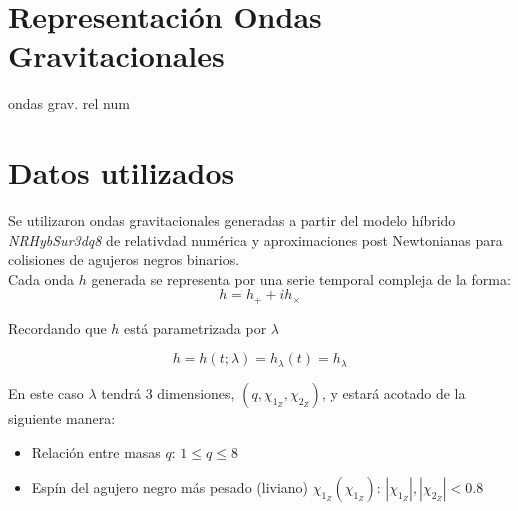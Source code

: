 
 



\newpage


\section{Representación Ondas Gravitacionales}

ondas grav. rel num \cite{Centrella_2010}
\section{Datos utilizados}

Se utilizaron ondas gravitacionales generadas a partir del modelo híbrido \textit{NRHybSur3dq8}\cite{Varma_2019} de relativdad numérica y aproximaciones post Newtonianas para colisiones de agujeros negros binarios.
\\

Cada onda \(h\) generada se representa por una serie temporal compleja de la forma:
\[
h = h_+ + ih_{\times}
\]


Recordando que $h$ está parametrizada por \(\lambda\)

 \[h = h(t; \lambda) = h_{\lambda}(t) = h_{\lambda} \]
 
En este caso \(\lambda\) tendrá 3 dimensiones, $(q, \chi_{1_Z},\chi_{2_Z}) $, y estará acotado de la siguiente manera:

\begin{itemize}
\item Relación entre masas $q$: $1 \le q \le 8$
\item Espín del agujero negro más pesado (liviano) $\chi_{1_Z} (\chi_{1_Z})$: $|\chi_{1_Z}|, |\chi_{2_Z}| < 0.8$
\end{itemize}

